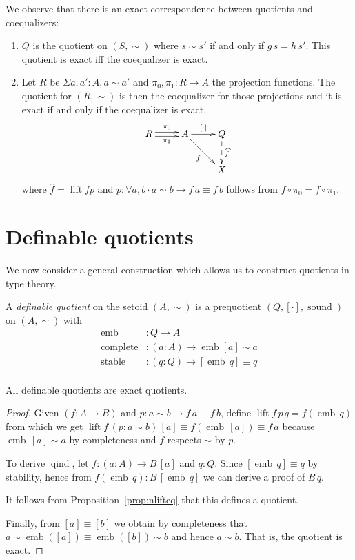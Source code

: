 \documentclass{llncs}
\newcommand{\bocks}[1]{[#1]}
\newcommand{\lift}[1]{\widehat{#1}}
\DeclareMathOperator*{\sound}{\mathrm{sound}}
\DeclareMathOperator{\qind}{\mathrm{qind}}
\DeclareMathOperator*{\emb}{\mathrm{emb}}
\DeclareMathOperator*{\compl}{\mathrm{complete}}
\DeclareMathOperator*{\stable}{\mathrm{stable}}
\DeclareMathOperator{\nlift}{\mathrm{lift}}
\begin{document}
We observe that there is an exact correspondence between quotients and coequalizers:
\begin{proposition}\hfill
\begin{enumerate}
\item $Q$ is the quotient on $(S,\sim)$ where $s\sim s'$ if and only if $g\,s=h\,s'$.
This quotient is exact if{f} the coequalizer is exact.
\item Let $R$ be $\Sigma a,a':A,a\sim a'$ and $\pi_0,\pi_1 : R\to A$ the projection functions. The quotient for $(R,\sim)$ is then the coequalizer for those projections and it is exact if and only if the coequalizer is exact.
\[\xymatrix{
R\ar@<0.5ex>[r]^{\pi_0}\ar@<-0.5ex>[r]_{\pi_1}& A\ar[r]^{\bocks\cdot}\ar[dr]_{f} & Q\ar@{-->}[d]^{\lift f}\\
&&X
}\]
where $\lift f=\nlift f p$ and $p \colon \forall a,b\cdot a\sim b \to f\,a \equiv f\,b$ follows from $f \circ \pi_0 = f \circ \pi_1$.
\end{enumerate}
\end{proposition}

\section{Definable quotients\\ }\label{sec:defquotients}

We now consider a general construction which allows us to construct quotients in type theory.

\begin{definition}\label{def:defquotients}
A \emph{definable quotient} on the setoid $(A,\sim)$ is a prequotient $(Q,\bocks\cdot,\sound)$ on $(A,\sim)$ with
\begin{align*}
\emb &: Q \to A\\
\compl &: (a : A) \to \emb {\bocks a} \sim a\\
\stable &: (q:Q) \to \bocks{\emb\,q} \equiv q\\
\end{align*}
\end{definition}

\begin{proposition}
All definable quotients are exact quotients.
\end{proposition}
\begin{proof}

Given $(f\colon A \to B)$ and $p : a\sim b \to f\,a \equiv f\,b$, define $\nlift f\, p \,q = f (\emb\,q)$ from which we get $\nlift f \,(p : a \sim b)\,\bocks a\equiv f(\emb\,\bocks a)\equiv f\,a$ because $\emb\,\bocks a\sim a$ by completeness and $f$ respects $\sim$ by $p$. 

To derive $\qind$, let $f:(a\colon A)\to B\,\bocks a$ and $q:Q$. Since $ \bocks{\emb\,q} \equiv q$ by stability, hence from $f (\emb\,q):B\,\bocks{\emb\,q}$ we can derive a proof of $B\,q$. 

It follows from Proposition~\ref{prop:nlifteq} that this defines a quotient. 

Finally, from $\bocks a \equiv \bocks b$ 
we obtain by completeness that $a\sim\emb(\bocks a)\equiv\emb(\bocks b)\sim b$ and hence $a\sim b$. That is, the quotient is exact.
\end{proof}
\end{document}
